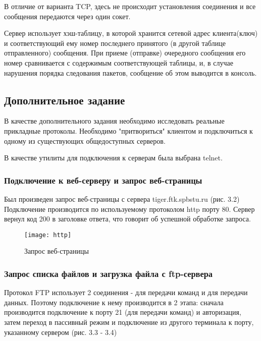 В отличие от варианта TCP, здесь не происходит установления соединения и все сообщения передаются через один сокет.

Сервер использует хэш-таблицу, в которой хранится сетевой адрес клиента(ключ) и соответствующий ему номер последнего принятого (в другой таблице  отправленного) сообщения. При приеме (отправке) очередного сообщения его номер сравнивается с содержимым соответствующей таблицы, и, в случае нарушения порядка следования пакетов, сообщение об этом выводится в консоль.

\subsection{Дополнительное задание}

В качестве дополнительного задания необходимо исследовать реальные прикладные протоколы. Необходимо "притвориться" клиентом и подключиться к одному из существующих общедоступных серверов.

В качестве утилиты для подключения к серверам была выбрана telnet.

\subsubsection{Подключение к веб-серверу и запрос веб-страницы}

Был произведен запрос веб-страницы с сервера tiger.ftk.spbstu.ru (рис. 3.2) Подключение производится по используемому протоколом http порту 80. Сервер вернул код 200 в заголовке ответа, что говорит об успешной обработке запроса.

\begin{figure}[H]
	\begin{center}
		\texttt{[image: http]}
		\caption{Запрос веб-страницы} 
		\label{pic:pic_name} %
	\end{center}
\end{figure}

\subsubsection{Запрос списка файлов и загрузка файла с ftp-сервера}

Протокол FTP использует 2 соединения - для передачи команд и для передачи данных. Поэтому подключение к нему производится в 2 этапа: сначала производится подключение к порту 21 (для передачи команд) и авторизация, затем переход в пассивный режим и подключение из другого терминала к порту, указанному сервером (рис. 3.3 - 3.4)

